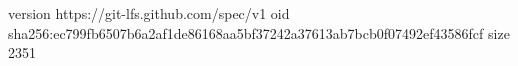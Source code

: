 version https://git-lfs.github.com/spec/v1
oid sha256:ec799fb6507b6a2af1de86168aa5bf37242a37613ab7bcb0f07492ef43586fcf
size 2351
